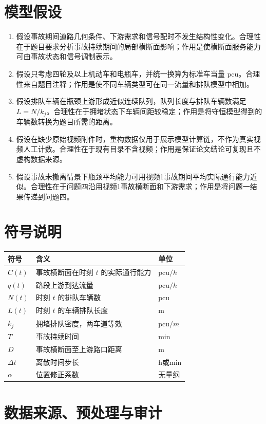 \documentclass[UTF8,a4paper,12pt]{ctexart}
\newcommand{\pcu}{\mathrm{pcu}}
\begin{document}
\section{模型假设}
\begin{enumerate}
\item 假设事故期间道路几何条件、下游需求和信号配时不发生结构性变化。合理性在于题目要求分析事故持续期间的局部横断面影响；作用是使横断面服务能力可由事故状态和信号调制表示。
\item 假设只考虑四轮及以上机动车和电瓶车，并统一换算为标准车当量 $\pcu$。合理性来自题目注释；作用是使不同车辆类型可在同一流量和排队模型中相加。
\item 假设排队车辆在瓶颈上游形成近似连续队列，队列长度与排队车辆数满足 $L=N/k_j$。合理性在于拥堵状态下车辆间距较稳定；作用是将守恒模型得到的车辆数转换为题目所需的距离。
\item 假设在缺少原始视频附件时，重构数据仅用于展示模型计算链，不作为真实视频人工计数。合理性在于现有目录不含视频；作用是保证论文结论可复现且不虚构数据来源。
\item 假设事故未撤离情景下瓶颈平均能力可用视频1事故期间平均实际通行能力近似。合理性在于问题四沿用视频1事故横断面和下游需求；作用是将问题一结果传递到问题四。
\end{enumerate}

\section{符号说明}
\begin{longtable}{lll}
\toprule
符号 & 含义 & 单位\\
\midrule
$C(t)$ & 事故横断面在时刻 $t$ 的实际通行能力 & $\pcu/h$\\
$q(t)$ & 路段上游到达流量 & $\pcu/h$\\
$N(t)$ & 时刻 $t$ 的排队车辆数 & $\pcu$\\
$L(t)$ & 时刻 $t$ 的车辆排队长度 & m\\
$k_j$ & 拥堵排队密度，两车道等效 & $\pcu/m$\\
$T$ & 事故持续时间 & min\\
$D$ & 事故横断面至上游路口距离 & m\\
$\Delta t$ & 离散时间步长 & h或min\\
$\alpha$ & 位置修正系数 & 无量纲\\
\bottomrule
\end{longtable}

\section{数据来源、预处理与审计}
\end{document}
